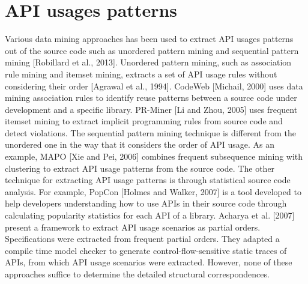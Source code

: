\section{API usages patterns}  \label{ch7-usage-patterns}

Various data mining approaches has been used to extract API usages patterns out of the source code such as unordered pattern mining and sequential pattern mining [Robillard et al., 2013]. Unordered pattern mining, such as association rule mining and itemset mining, extracts a set of API usage rules without considering their order [Agrawal et al., 1994]. CodeWeb [Michail, 2000] uses data mining association rules to identify reuse patterns between a source code under development and a specific library. PR-Miner [Li and Zhou, 2005] uses frequent itemset mining to extract implicit programming rules from source code and detect violations. The sequential pattern mining technique is different from the unordered one in the way that it considers the order of API usage. As an example, MAPO [Xie and Pei, 2006] combines frequent subsequence mining with clustering to extract API usage patterns from the source code. The other technique for extracting API usage patterns is through statistical source code analysis. For example, PopCon [Holmes and Walker, 2007] is a tool developed to help developers understanding how to use APIs in their source code through calculating popularity statistics for each API of a library. Acharya et al. [2007] present a framework to extract API usage scenarios as partial orders. Specifications were extracted from frequent partial orders. They adapted a compile time model checker to generate control-flow-sensitive static traces of APIs, from which API usage scenarios were extracted. However, none of these approaches suffice to determine the detailed structural correspondences.


